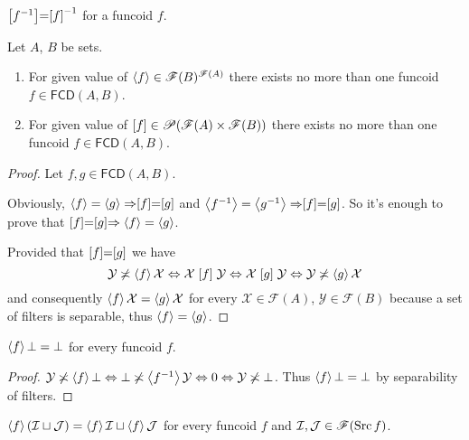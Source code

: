\begin{obvious}
$\mathrel{\left[f^{-1}\right]}=\mathrel{\left[f\right]}^{-1}$ for a funcoid $f$.\end{obvious}
\begin{thm}
Let $A$, $B$ be sets.
\begin{enumerate}
\item For given value of $\left\langle f\right\rangle\in\mathscr{F}(B)^{\mathscr{F}(A)}$
there exists no more than one funcoid $f\in\mathsf{FCD}(A,B)$.
\item For given value of $\mathord{\mathrel{\left[f\right]}}\in\mathscr{P}(\mathscr{F}(A)\times\mathscr{F}(B))$
there exists no more than one funcoid $f\in\mathsf{FCD}(A,B)$.
\end{enumerate}
\end{thm}
\begin{proof}
Let $f,g\in\mathsf{FCD}(A,B)$.

Obviously, $\left\langle f\right\rangle=\left\langle g\right\rangle\Rightarrow\mathrel{\left[f\right]}=\mathrel{\left[g\right]}$ and
$\left\langle f^{-1}\right\rangle=\left\langle g^{-1}\right\rangle\Rightarrow\mathrel{\left[f\right]}=\mathrel{\left[g\right]}$.
So it's enough to prove that $\mathrel{\left[f\right]}=\mathrel{\left[g\right]}\Rightarrow\left\langle f\right\rangle=\left\langle g\right\rangle$.

Provided that $\mathrel{\left[f\right]}=\mathrel{\left[g\right]}$ we have \[\mathcal{Y}\not\asymp\left\langle f\right\rangle\mathcal{X}\Leftrightarrow\mathcal{X}\mathrel{\left[f\right]}\mathcal{Y}\Leftrightarrow\mathcal{X}\mathrel{\left[g\right]}\mathcal{Y}\Leftrightarrow\mathcal{Y}\not\asymp\left\langle g\right\rangle\mathcal{X}\]
and consequently $\left\langle f\right\rangle\mathcal{X}=\left\langle g\right\rangle\mathcal{X}$ for
every $\mathcal{X}\in\mathscr{F}(A)$, $\mathcal{Y}\in\mathscr{F}(B)$
because a set of filters is separable, thus $\left\langle f\right\rangle=\left\langle g\right\rangle$.\end{proof}
\begin{prop}
$\left\langle f\right\rangle\bot=\bot$
for every funcoid $f$.\end{prop}
\begin{proof}
$\mathcal{Y}\not\asymp\left\langle f\right\rangle\bot\Leftrightarrow\bot\not\asymp\left\langle f^{-1}\right\rangle\mathcal{Y}\Leftrightarrow0\Leftrightarrow\mathcal{Y}
\not\asymp\bot$.
Thus $\left\langle f\right\rangle\bot=\bot$
by separability of filters.\end{proof}
\begin{prop}
$\left\langle f\right\rangle(\mathcal{I}\sqcup\mathcal{J})=\left\langle f\right\rangle\mathcal{I}\sqcup\left\langle f\right\rangle\mathcal{J}$
for every funcoid $f$ and $\mathcal{I},\mathcal{J}\in\mathscr{F}(\operatorname{Src}
f)$.\end{prop}
